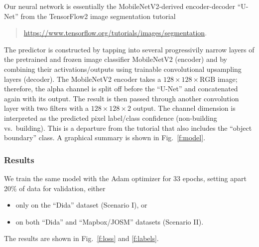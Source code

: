 \documentclass[12pt,a4paper]{article}
\begin{document}
    Our neural network
    is essentially 
    the MobileNetV2-derived
    encoder-decoder ``U-Net''
    from the TensorFlow2 image segmentation tutorial
    \begin{quote}
        \href{https://www.tensorflow.org/tutorials/images/segmentation}{https://www.tensorflow.org/tutorials/images/segmentation}.
    \end{quote}
    The predictor is 
    constructed 
    by tapping into several 
    progressivily narrow layers 
    of the pretrained and frozen
    image classifier MobileNetV2 (encoder)
    and
    by combining their activations/outputs using 
    trainable 
    convolutional
    upsampling layers (decoder).
    The MobileNetV2 encoder 
    takes a $128 \times 128 \times \text{RGB}$ image;
    therefore,
    the alpha channel is split off
    before the ``U-Net''
    and 
    concatenated again with its output.
    The result is then passed through another
    convolution layer with two filters
    with a $128 \times 128 \times 2$ output.
    The channel dimension is 
    interpreted as the predicted pixel label/class confidence
    (non-building vs.~building).
    This is a departure from the tutorial
    that also includes the ``object boundary'' class.
    A graphical summary is shown in Fig.~\ref{f:model}.
    
    
    

    \subsubsection*{Results}
    
    We train the same model with the Adam optimizer for 33 epochs,
    setting apart 20\% of data for validation,
    either 
    \begin{itemize}
    \item 
        only on the ``Dida'' dataset (Scenario I), or
    \item
        on both ``Dida'' and ``Mapbox/JOSM'' datasets (Scenario II).
    \end{itemize}
    
    The results are shown in Fig.~\ref{f:loss} and \ref{f:labels}.
    
\end{document}
